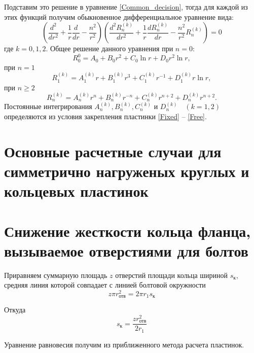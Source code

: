 Подставим это решение в уравнение \eqref{Common_decision}, тогда для каждой из этих функций получим обыкновенное дифференциальное уравнение вида:
\begin{equation}
  \label{Clebsch}
  \left (\frac{d^2}{d r^2}+\frac{1}{r} \frac{d}{d r}-\frac{n^2}{r^2} \right ) \left (\frac{d ^2 R_{n}^{(k)}}{d r^2}+\frac{1}{r} \frac{d R_{n}^{(k)}}{d r}-\frac{n^2}{r^2} R_{n}^{(k)} \right )=0
\end{equation}
где $k=0,1,2$. Общее решение данного уравнения при $n=0$:
\begin{equation}
  \label{R_0}
  R_0^0=A_0+B_{0}r^2+C_{0} \ln{r}+D_{0}r^2 \ln{r},
\end{equation}
при $n=1$
\begin{equation}
  \label{R_1^k}
  R_1^{(k)}=A_1^{(k)}r+B_1^{(k)}r^3+C_1^{(k)} r^{-1}+D_1^{(k)}r \ln{r},
\end{equation}
при $n \geq 2$
\begin{equation}
  \label{R_n^k}
  R_n^{(k)}=A_n^{(k)}r^{n}+B_n^{(k)}r^{-n}+C_n^{(k)} r^{n+2}+D_n^{(k)} r^{n+2}.
\end{equation}
Постоянные интегрирования $A_n^{(k)}, B_n^{(k)}, C_n^{(k)}$ и $D_n^{(k)} \quad (k=1,2)$ определяются из условия закрепления пластинки \eqref{Fixed} -- \eqref{Free}.

\section{Основные расчетные случаи для симметрично нагруженых круглых и кольцевых пластинок}



\section{Снижение жесткости кольца фланца, вызываемое отверстиями для болтов}
\label{RingStiff}

Приравняем суммарную площадь $z$ отверстий площади кольца шириной $s_{\text{к}}$, средняя линия которой совпадает с линией болтовой окружности 
\begin{equation}
  \label{RingStiff_eq1}
  z \pi r_{\text{отв}}^{2} = 2 \pi r_{1} s_{\text{к}} 
\end{equation}

Откуда 
\begin{equation}
\label{s_k}
  s_{\text{к}}=\frac{zr_{\text{отв}}^{2}}{2r_{1}}
\end{equation}

Уравнение равновесия получим из приближенного метода расчета пластинок.

